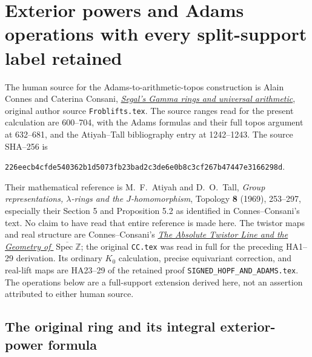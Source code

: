 \section{Exterior powers and Adams operations with every split-support label retained}
\label{sec:full-lattice-adams}

The human source for the Adams-to-arithmetic-topos construction is
Alain Connes and Caterina Consani,
\href{https://arxiv.org/abs/2004.08879v1}{\emph{Segal's Gamma rings and
universal arithmetic}}, original author source \nolinkurl{Froblifts.tex}.
The source ranges read for the present calculation are 600--704,
with the Adams formulas and their full topos argument at 632--681,
and the Atiyah--Tall bibliography entry at 1242--1243. The source
SHA--256 is
\par\noindent
\nolinkurl{226eecb4cfde540362b1d5073fb23bad2c3de6e0b8c3cf267b47447e3166298d}.
\par\noindent
Their mathematical reference is M.~F.~Atiyah and D.~O.~Tall,
\emph{Group representations, $\lambda$-rings and the
$J$-homomorphism}, Topology \textbf{8} (1969), 253--297,
especially their Section 5 and Proposition 5.2 as identified in
Connes--Consani's text. No claim to have read that entire reference
is made here. The twistor maps and real structure are Connes--Consani's
\href{https://arxiv.org/abs/2609.00299v1}{\emph{The Absolute Twistor
Line and the Geometry of $\overline{\operatorname{Spec}\mathbb Z}$}};
the original \nolinkurl{CC.tex} was read in full for the preceding
HA1--29 derivation. Its ordinary $K_0$ calculation, precise equivariant
correction, and real-lift maps are HA23--29 of the retained proof
\nolinkurl{SIGNED_HOPF_AND_ADAMS.tex}. The operations below are a
full-support extension derived here, not an assertion attributed
to either human source.

\subsection{The original ring and its integral exterior-power formula}


